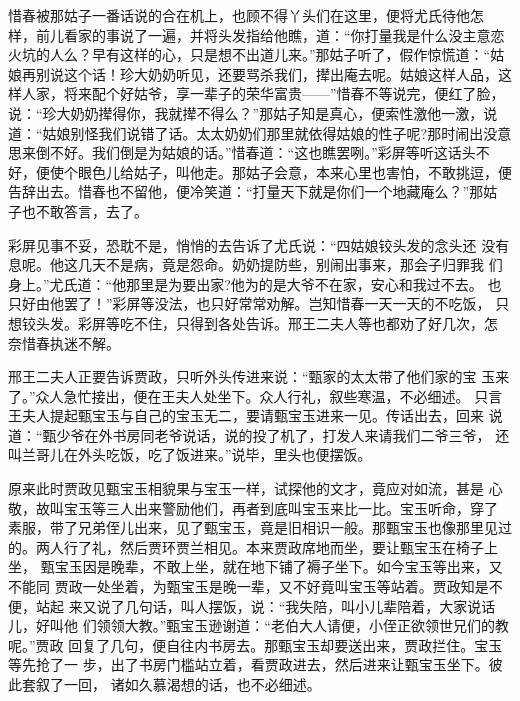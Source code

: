 惜春被那姑子一番话说的合在机上，也顾不得丫头们在这里，便将尤氏待他怎
样，前儿看家的事说了一遍，并将头发指给他瞧，道：“你打量我是什么没主意恋
火坑的人么？早有这样的心，只是想不出道儿来。”那姑子听了，假作惊慌道：“姑
娘再别说这个话！珍大奶奶听见，还要骂杀我们，撵出庵去呢。姑娘这样人品，这
样人家，将来配个好姑爷，享一辈子的荣华富贵——”惜春不等说完，便红了脸，
说：“珍大奶奶撵得你，我就撵不得么？”那姑子知是真心，便索性激他一激，说
道：“姑娘别怪我们说错了话。太太奶奶们那里就依得姑娘的性子呢?那时闹出没意
思来倒不好。我们倒是为姑娘的话。”惜春道：“这也瞧罢咧。”彩屏等听这话头不
好，便使个眼色儿给姑子，叫他走。那姑子会意，本来心里也害怕，不敢挑逗，便
告辞出去。惜春也不留他，便冷笑道：“打量天下就是你们一个地藏庵么？”那姑
子也不敢答言，去了。

彩屏见事不妥，恐耽不是，悄悄的去告诉了尤氏说：“四姑娘铰头发的念头还
没有息呢。他这几天不是病，竟是怨命。奶奶提防些，别闹出事来，那会子归罪我
们身上。”尤氏道：“他那里是为要出家?他为的是大爷不在家，安心和我过不去。
也只好由他罢了！”彩屏等没法，也只好常常劝解。岂知惜春一天一天的不吃饭，
只想铰头发。彩屏等吃不住，只得到各处告诉。邢王二夫人等也都劝了好几次，怎
奈惜春执迷不解。

邢王二夫人正要告诉贾政，只听外头传进来说：“甄家的太太带了他们家的宝
玉来了。”众人急忙接出，便在王夫人处坐下。众人行礼，叙些寒温，不必细述。
只言王夫人提起甄宝玉与自己的宝玉无二，要请甄宝玉进来一见。传话出去，回来
说道：“甄少爷在外书房同老爷说话，说的投了机了，打发人来请我们二爷三爷，
还叫兰哥儿在外头吃饭，吃了饭进来。”说毕，里头也便摆饭。

原来此时贾政见甄宝玉相貌果与宝玉一样，试探他的文才，竟应对如流，甚是
心敬，故叫宝玉等三人出来警励他们，再者到底叫宝玉来比一比。宝玉听命，穿了
素服，带了兄弟侄儿出来，见了甄宝玉，竟是旧相识一般。那甄宝玉也像那里见过
的。两人行了礼，然后贾环贾兰相见。本来贾政席地而坐，要让甄宝玉在椅子上坐，
甄宝玉因是晚辈，不敢上坐，就在地下铺了褥子坐下。如今宝玉等出来，又不能同
贾政一处坐着，为甄宝玉是晚一辈，又不好竟叫宝玉等站着。贾政知是不便，站起
来又说了几句话，叫人摆饭，说：“我失陪，叫小儿辈陪着，大家说话儿，好叫他
们领领大教。”甄宝玉逊谢道：“老伯大人请便，小侄正欲领世兄们的教呢。”贾政
回复了几句，便自往内书房去。那甄宝玉却要送出来，贾政拦住。宝玉等先抢了一
步，出了书房门槛站立着，看贾政进去，然后进来让甄宝玉坐下。彼此套叙了一回，
诸如久慕渴想的话，也不必细述。

